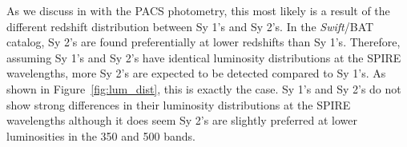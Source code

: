 As we discuss in \citet{Melendez:2014yu} with the PACS photometry, this most likely is a result of the different redshift distribution between Sy 1's and Sy 2's. In the \textit{Swift}/BAT catalog, Sy 2's are found preferentially at lower redshifts than Sy 1's. Therefore, assuming Sy 1's and Sy 2's have identical luminosity distributions at the SPIRE wavelengths, more Sy 2's are expected to be detected compared to Sy 1's. As shown in Figure~\ref{fig:lum_dist}, this is exactly the case. Sy 1's and Sy 2's do not show strong differences in their luminosity distributions at the SPIRE wavelengths although it does seem Sy 2's are slightly preferred at lower luminosities in the 350 and 500 \um{} bands. 